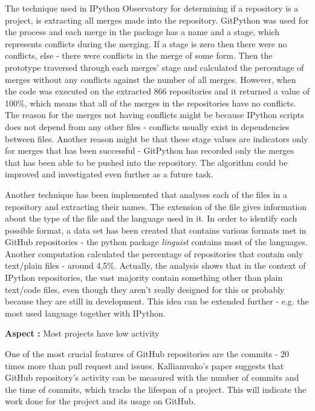 The technique used in IPython Observatory for determining if a repository is a project, is extracting all merges made into the repository. GitPython was used for the process and each merge in the package has a name and a stage, which represents conflicts during the merging. If a stage is zero then there were no conflicts, else - there were conflicts in the merge of some form. Then the prototype traversed through each merges' stage and calculated the percentage of merges without any conflicts against the number of all merges. However, when the code was executed on the extracted 866 repositories and it returned a value of 100\%, which means that all of the merges in the repositories have no conflicts. The reason for the merges not having conflicts might be because IPython scripts does not depend from any other files - conflicts usually exist in dependencies between files. Another reason might be that these stage values are indicators only for merges that has been successful - GitPython has recorded only the merges that has been able to be pushed into the repository. The algorithm could be improved and investigated even further as a future task. 

Another technique has been implemented that analyses each of the files in a repository and extracting their names. The extension of the file gives information about the type of the file and the language used in it. In order to identify each possible format, a data set has been created that contains various formats met in GitHub repositories - the python package \textit{linguist}\cite{linguist} contains most of the languages. Another computation calculated the percentage of repositories that contain only text/plain files - around 4,5\%. Actually, the analysis shows that in the context of IPython repositories, the vast majority contain something other than plain text/code files, even though they aren't really designed for this or probably because they are still in development. This idea can be extended further - e.g. the most used language together with IPython.

\vspace{5mm}
\begin{mdframed}
\vspace{1px}
\textbf{Aspect :}  Most projects have low activity
\vspace{1px}
\end{mdframed}
\vspace{2mm}

One of the most crucial features of GitHub repositories are the commits - 20 times more than pull request and issues\cite{kalliamvakoupromises}. Kalliamvako's paper\cite{kalliamvakoupromises} suggests that GitHub repository's activity can be measured with the number of commits and the time of commits, which tracks the lifespan of a project. This will indicate the work done for the project and its usage on GitHub.

